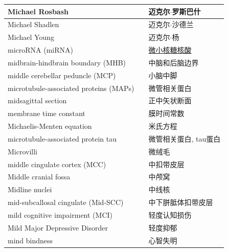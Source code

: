 \begin{longtable}{lll}
	\midrule
	Michael Rosbash   && 迈克尔$\cdot$罗斯巴什  \\
	
	\midrule
	Michael Shadlen   && 迈克尔$\cdot$沙德兰  \\
	
	\midrule
	Michael Young   && 迈克尔$\cdot$杨  \\
	
	\midrule
	microRNA (miRNA)   && \href{https://baike.baidu.com/item/micro\%20RNA/3683223}{微小核糖核酸}  \\
	
	\midrule
	midbrain-hindbrain boundary (MHB) && 中脑和后脑边界  \\
	
	\midrule
	middle cerebellar peduncle (MCP)  && 小脑中脚  \\
	
	\midrule
	microtubule-associated proteins (MAPs)  && 微管相关蛋白  \\
	
	\midrule
	midsagittal section  && 正中矢状断面  \\
	
	\midrule
	membrane time constant   && 膜时间常数  \\
	
	\midrule
	Michaelis-Menten equation   && 米氏方程  \\
	
	\midrule
	microtubule-associated protein tau    && 微管相关蛋白, tau蛋白  \\
	
	\midrule
	Microvilli    && 微绒毛  \\
	
	\midrule
	middle cingulate cortex (MCC)   && 中扣带皮层  \\
	
	\midrule
	Middle cranial fossa   && 中颅窝  \\
	
	\midrule
	Midline nuclei   && 中线核  \\
	
	\midrule
	mid-subcallosal cingulate (Mid-SCC)  && 中下胼胝体扣带皮层  \\
	
	\midrule
	mild cognitive impairment (MCI)  && 轻度认知损伤  \\
	
	\midrule
	Mild Major Depressive Disorder  && 轻度抑郁  \\
	
	\midrule
	mind bindness  && 心智失明  \\
	

\end{longtable}

